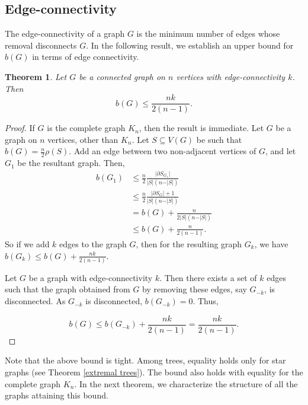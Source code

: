 \documentclass[12pt]{article}
\newtheorem{theorem}{Theorem}[section]
\begin{document}
\subsection{Edge-connectivity}
     The edge-connectivity of a graph $G$ is the minimum number of edges whose removal disconnects $G$. In the following result, we establish an upper bound for $b(G)$ in terms of edge connectivity.
\begin{theorem}\label{edge-connc-b(g)} Let $G$ be a connected graph on $n$ vertices with edge-connectivity $k$. Then
$$
b(G) \leq \frac{nk}{2(n-1)}.
$$
\end{theorem}

\begin{proof}
    If $G$ is the complete graph $K_n$, then the result is immediate. Let $G$ be a graph on $n$ vertices, other than $K_n$. Let $S\subseteq V(G)$ be such that $b(G)=\frac{n}{2} \rho(S)$. Add an edge between two non-adjacent vertices of $G$, and let $G_1$ be the resultant graph. Then, 
    \begin{align*}
        b(G_1) &\leq \frac{n}{2} \frac{\vert \partial S_{G_1} \vert}{\vert S\vert(n-\vert S\vert)}\\
        &\leq \frac{n}{2} \frac{\vert \partial S_G \vert+1}{|S|(n-\vert S \vert)}\\
        &=b(G)+\frac{n}{2\vert S \vert (n-\vert S\vert )}\\
        &\leq b(G) + \frac{n}{2(n-1)}.
    \end{align*}
    So if we add $k$ edges to the graph $G$, then for the resulting graph $G_k$, we have $b(G_k) \leq b(G) + \frac{nk}{2(n-1)}$.
    
    Let $G$ be a graph with edge-connectivity $k$. Then there exists a set of $k$ edges such that the graph obtained from $G$ by removing these edges, say $G_{-k}$, is disconnected. As $G_{-k}$ is disconnected,  $b(G_{-k}) = 0$.  Thus,

    $$
b(G) \leq b(G_{-k}) +\frac{nk}{2(n-1)}=\frac{nk}{2(n-1)}.
    $$
    
\end{proof}
Note that the above bound is tight. Among trees, equality holds only for star graphs (see Theorem \ref{extremal trees}). The bound also holds with equality for the complete  graph $K_n$. In the next theorem, we characterize the structure of all the graphs attaining this bound.
\end{document}
